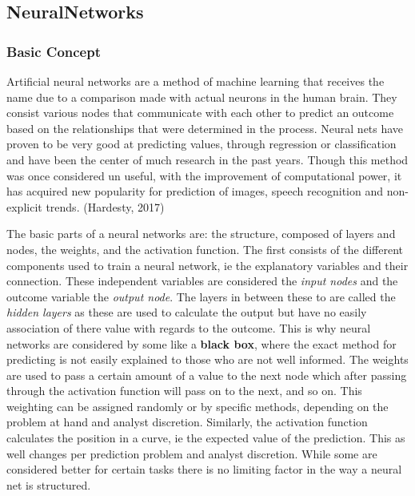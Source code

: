 \documentclass[
  paper=a4,
  ,captions=tableheading
]{scrartcl}
\begin{document}
\hypertarget{neuralnetworks}{%
\subsection{NeuralNetworks}\label{neuralnetworks}}

\hypertarget{basic-concept}{%
\subsubsection{Basic Concept}\label{basic-concept}}

Artificial neural networks are a method of machine learning that
receives the name due to a comparison made with actual neurons in the
human brain. They consist various nodes that communicate with each other
to predict an outcome based on the relationships that were determined in
the process. Neural nets have proven to be very good at predicting
values, through regression or classification and have been the center of
much research in the past years. Though this method was once considered
un useful, with the improvement of computational power, it has acquired
new popularity for prediction of images, speech recognition and
non-explicit trends. (Hardesty, 2017)

The basic parts of a neural networks are: the structure, composed of
layers and nodes, the weights, and the activation function. The first
consists of the different components used to train a neural network, ie
the explanatory variables and their connection. These independent
variables are considered the \emph{input nodes} and the outcome variable
the \emph{output node}. The layers in between these to are called the
\emph{hidden layers} as these are used to calculate the output but have
no easily association of there value with regards to the outcome. This
is why neural networks are considered by some like a \textbf{black box},
where the exact method for predicting is not easily explained to those
who are not well informed. The weights are used to pass a certain amount
of a value to the next node which after passing through the activation
function will pass on to the next, and so on. This weighting can be
assigned randomly or by specific methods, depending on the problem at
hand and analyst discretion. Similarly, the activation function
calculates the position in a curve, ie the expected value of the
prediction. This as well changes per prediction problem and analyst
discretion. While some are considered better for certain tasks there is
no limiting factor in the way a neural net is structured.
\end{document}
